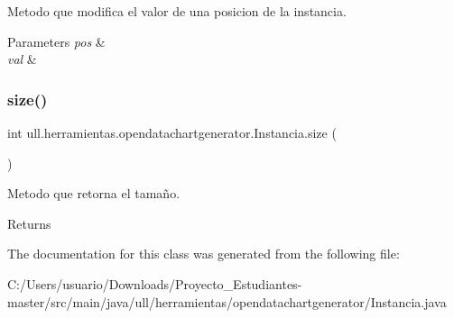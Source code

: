 Metodo que modifica el valor de una posicion de la instancia. 


\begin{DoxyParams}{Parameters}
{\em pos} & \\
\hline
{\em val} & \\
\hline
\end{DoxyParams}
\mbox{\label{classull_1_1herramientas_1_1opendatachartgenerator_1_1_instancia_a6b61e0eca004993c4243245c0e8ba4e4}} 
\subsubsection{\texorpdfstring{size()}{size()}}
{\footnotesize\ttfamily int ull.\+herramientas.\+opendatachartgenerator.\+Instancia.\+size (\begin{DoxyParamCaption}{ }\end{DoxyParamCaption})}



Metodo que retorna el tamaño. 

\begin{DoxyReturn}{Returns}

\end{DoxyReturn}


The documentation for this class was generated from the following file\+:\begin{DoxyCompactItemize}
\item 
C\+:/\+Users/usuario/\+Downloads/\+Proyecto\+\_\+\+Estudiantes-\/master/src/main/java/ull/herramientas/opendatachartgenerator/Instancia.\+java\end{DoxyCompactItemize}
